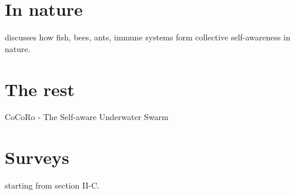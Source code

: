 \documentclass{article}
\begin{document}
	\section{In nature}
	\citet{mitchell-2005-self-awareness-and-control-in-decentralized-systems} discusses how fish, bees, ants, immune systems form collective self-awareness in nature. 	
	\section{The rest}
	\cite{kernbach-2011-awareness-and-self-awareness-for-multi-robot-organisms}
	 
	CoCoRo - The Self-aware Underwater Swarm \cite{schmickl-2011-cocoro-the-self-aware-underwater-swarm}
	\section{Surveys}
	\cite{lewis-2011-a-survey-of-self-awareness-and-its-application-in-computing-systems} starting from section II-C.
	
\end{document}
